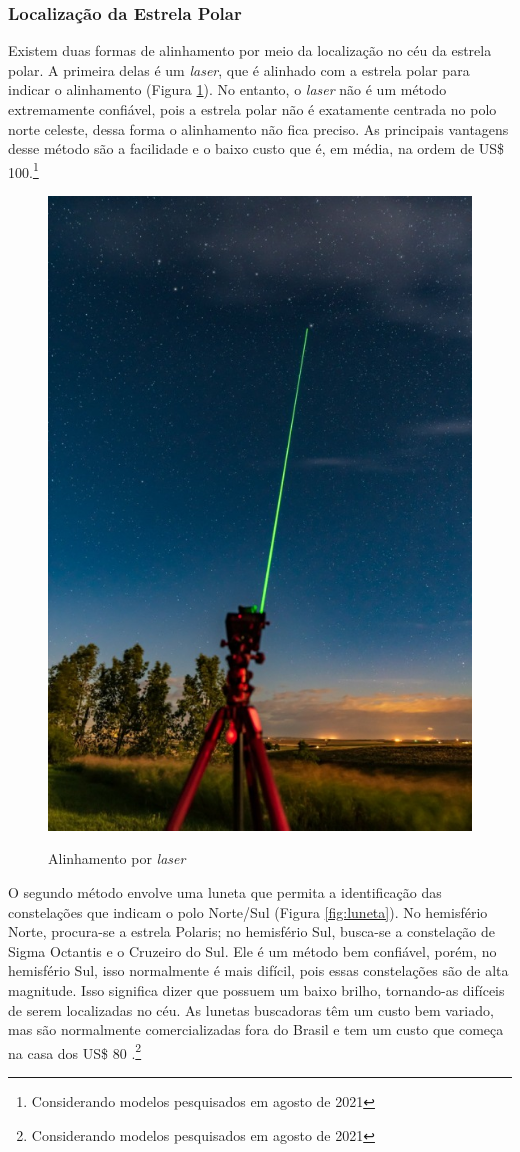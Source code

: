\subsubsection{Localização da Estrela Polar}
Existem duas formas de alinhamento por meio da localização no céu da estrela polar. A primeira delas é um \textit{laser}, que é alinhado com a estrela polar para indicar o alinhamento (Figura \ref{fig:alinhamentolaser}). No entanto, o \textit{laser} não é um método extremamente confiável, pois a estrela polar não é exatamente centrada no polo norte celeste, dessa forma o alinhamento não fica preciso. As principais vantagens desse método são a facilidade e o baixo custo que é, em média, na ordem de US\$ 100.\footnote{Considerando modelos pesquisados em agosto de 2021}

 \begin{figure}[!htb]
	\centering
	\caption{Alinhamento por \textit{laser}}
	\includegraphics[width=0.3\linewidth]{figuras/revisaobiblio/alinhamentolaser}
	\label{fig:alinhamentolaser}
\end{figure}


O segundo método envolve uma luneta que permita a identificação das constelações que indicam o polo Norte/Sul (Figura \ref{fig:luneta}). No hemisfério Norte, procura-se a estrela Polaris; no hemisfério Sul, busca-se a constelação de Sigma Octantis e o Cruzeiro do Sul. Ele é um método bem confiável, porém, no hemisfério Sul, isso normalmente é mais difícil, pois essas constelações são de alta magnitude. Isso significa dizer que possuem um baixo brilho, tornando-as difíceis de serem localizadas no céu. As lunetas buscadoras têm um custo bem variado, mas são normalmente comercializadas fora do Brasil e tem um custo que começa na casa dos US\$ 80 .\footnote{Considerando modelos pesquisados em agosto de 2021}

